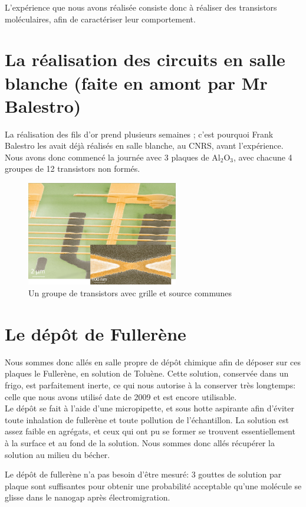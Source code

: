 L'expérience que nous avons réalisée consiste donc à réaliser des transistors moléculaires, afin de caractériser leur comportement.
\section{La réalisation des circuits en salle blanche (faite en amont par Mr Balestro)}
La réalisation des fils d'or prend plusieurs semaines ; c'est pourquoi Frank Balestro les avait déjà réalisés en salle blanche, au CNRS, avant l'expérience.
Nous avons donc commencé la journée avec 3 plaques de Al$_2$O$_3$, avec chacune 4 groupes de 12 transistors non formés.
\begin{figure}[h]
    \begin{center}
        \includegraphics[width=250px]{Images/GroupeDeTransistors}
        \caption{Un groupe de transistors avec grille et source communes}
        \label{fig:}
    \end{center}
\end{figure}
\section{Le dépôt de Fullerène}
Nous sommes donc allés en salle propre de dépôt chimique afin de déposer sur ces plaques le Fullerène, en solution de Toluène.
Cette solution, conservée dans un frigo, est parfaitement inerte, ce qui nous autorise à la conserver très longtemps: celle que nous avons utilisé date de 2009 et est encore utilisable.\\

Le dépôt se fait à l'aide d'une micropipette, et sous hotte aspirante afin d'éviter toute inhalation de fullerène et toute pollution de l'échantillon.
La solution est assez faible en agrégats, et ceux qui ont pu se former se trouvent essentiellement à la surface et au fond de la solution. Nous sommes donc allés récupérer la solution au milieu du bécher.

Le dépôt de fullerène n'a pas besoin d'être mesuré: 3 gouttes de solution par plaque sont suffisantes pour obtenir une probabilité acceptable qu'une molécule se glisse dans le nanogap après électromigration.


